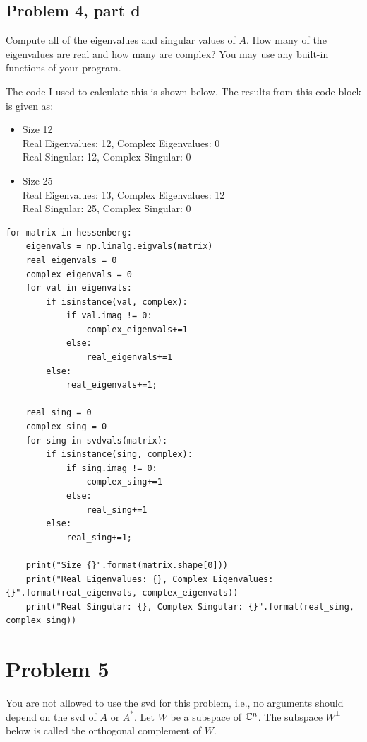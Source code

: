 \subsection{Problem 4, part d}
Compute all of the eigenvalues and singular values of $A$. How many of the eigenvalues are real and how many are complex? You may use any built-in functions of your program.
\partbreak
\begin{solution}

    The code I used to calculate this is shown below. The results from this code block is given as:
\begin{itemize}
    \item Size 12\\
          Real Eigenvalues: 12, Complex Eigenvalues: 0\\
          Real Singular: 12, Complex Singular: 0\\
    \item Size 25\\
          Real Eigenvalues: 13, Complex Eigenvalues: 12\\
          Real Singular: 25, Complex Singular: 0
\end{itemize}
    \begin{lstlisting}
for matrix in hessenberg:
    eigenvals = np.linalg.eigvals(matrix)
    real_eigenvals = 0
    complex_eigenvals = 0
    for val in eigenvals:
        if isinstance(val, complex):
            if val.imag != 0:
                complex_eigenvals+=1
            else:
                real_eigenvals+=1
        else:
            real_eigenvals+=1;
    
    real_sing = 0
    complex_sing = 0
    for sing in svdvals(matrix):
        if isinstance(sing, complex):
            if sing.imag != 0:
                complex_sing+=1
            else:
                real_sing+=1
        else:
            real_sing+=1;
            
    print("Size {}".format(matrix.shape[0]))
    print("Real Eigenvalues: {}, Complex Eigenvalues: {}".format(real_eigenvals, complex_eigenvals))
    print("Real Singular: {}, Complex Singular: {}".format(real_sing, complex_sing))
    \end{lstlisting}
\end{solution}
\newpage
\section{Problem 5}
You are not allowed to use the svd for this problem, i.e., no arguments should depend on the svd of $A$ or $A^*$. Let $W$ be a subspace of $\mathbb{C}^n$. The subspace $W^ \perp $ below is called the orthogonal complement of $W$.

